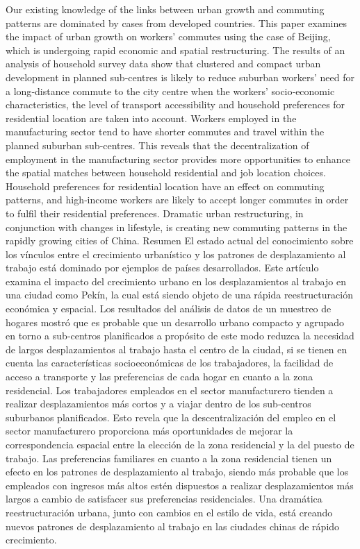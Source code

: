 Our existing knowledge of the links between urban growth and commuting patterns are dominated by cases from developed countries. This paper examines the impact of urban growth on workers' commutes using the case of Beijing, which is undergoing rapid economic and spatial restructuring. The results of an analysis of household survey data show that clustered and compact urban development in planned sub‐centres is likely to reduce suburban workers' need for a long‐distance commute to the city centre when the workers' socio‐economic characteristics, the level of transport accessibility and household preferences for residential location are taken into account. Workers employed in the manufacturing sector tend to have shorter commutes and travel within the planned suburban sub‐centres. This reveals that the decentralization of employment in the manufacturing sector provides more opportunities to enhance the spatial matches between household residential and job location choices. Household preferences for residential location have an effect on commuting patterns, and high‐income workers are likely to accept longer commutes in order to fulfil their residential preferences. Dramatic urban restructuring, in conjunction with changes in lifestyle, is creating new commuting patterns in the rapidly growing cities of China. Resumen El estado actual del conocimiento sobre los vínculos entre el crecimiento urbanístico y los patrones de desplazamiento al trabajo está dominado por ejemplos de países desarrollados. Este artículo examina el impacto del crecimiento urbano en los desplazamientos al trabajo en una ciudad como Pekín, la cual está siendo objeto de una rápida reestructuración económica y espacial. Los resultados del análisis de datos de un muestreo de hogares mostró que es probable que un desarrollo urbano compacto y agrupado en torno a sub‐centros planificados a propósito de este modo reduzca la necesidad de largos desplazamientos al trabajo hasta el centro de la ciudad, si se tienen en cuenta las características socioeconómicas de los trabajadores, la facilidad de acceso a transporte y las preferencias de cada hogar en cuanto a la zona residencial. Los trabajadores empleados en el sector manufacturero tienden a realizar desplazamientos más cortos y a viajar dentro de los sub‐centros suburbanos planificados. Esto revela que la descentralización del empleo en el sector manufacturero proporciona más oportunidades de mejorar la correspondencia espacial entre la elección de la zona residencial y la del puesto de trabajo. Las preferencias familiares en cuanto a la zona residencial tienen un efecto en los patrones de desplazamiento al trabajo, siendo más probable que los empleados con ingresos más altos estén dispuestos a realizar desplazamientos más largos a cambio de satisfacer sus preferencias residenciales. Una dramática reestructuración urbana, junto con cambios en el estilo de vida, está creando nuevos patrones de desplazamiento al trabajo en las ciudades chinas de rápido crecimiento.